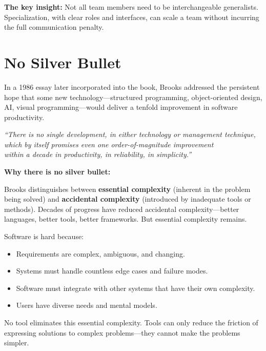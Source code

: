 \documentclass[11pt, letterpaper]{article}
\begin{document}
\textbf{The key insight:} Not all team members need to be interchangeable generalists. Specialization, with clear roles and interfaces, can scale a team without incurring the full communication penalty.

\vspace{1em}

\section*{No Silver Bullet}

In a 1986 essay later incorporated into the book, Brooks addressed the persistent hope that some new technology---structured programming, object-oriented design, AI, visual programming---would deliver a tenfold improvement in software productivity.

\begin{center}
\textit{``There is no single development, in either technology or management technique,\\which by itself promises even one order-of-magnitude improvement\\within a decade in productivity, in reliability, in simplicity.''}
\end{center}

\vspace{0.5em}

\textbf{Why there is no silver bullet:}

Brooks distinguishes between \textbf{essential complexity} (inherent in the problem being solved) and \textbf{accidental complexity} (introduced by inadequate tools or methods). Decades of progress have reduced accidental complexity---better languages, better tools, better frameworks. But essential complexity remains.

Software is hard because:
\begin{itemize}
    \item Requirements are complex, ambiguous, and changing.
    \item Systems must handle countless edge cases and failure modes.
    \item Software must integrate with other systems that have their own complexity.
    \item Users have diverse needs and mental models.
\end{itemize}

No tool eliminates this essential complexity. Tools can only reduce the friction of expressing solutions to complex problems---they cannot make the problems simpler.
\end{document}

